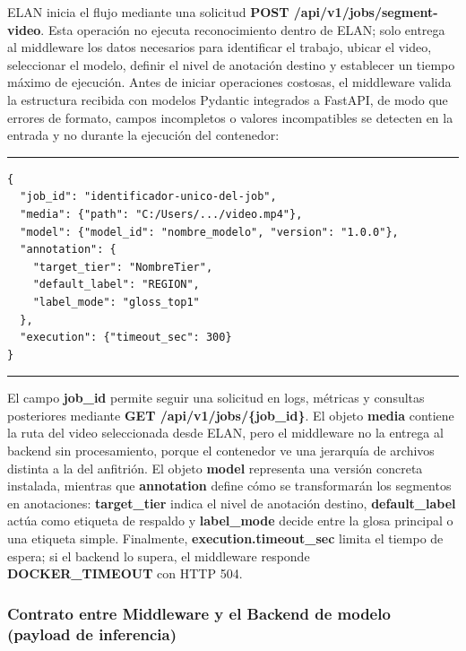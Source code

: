 \documentclass[11pt,a4paper]{article}
\begin{document}
ELAN inicia el flujo mediante una solicitud \textbf{POST /api/v1/jobs/segment-video}. Esta operación no ejecuta reconocimiento dentro de ELAN; solo entrega al middleware los datos necesarios para identificar el trabajo, ubicar el video, seleccionar el modelo, definir el nivel de anotación destino y establecer un tiempo máximo de ejecución. Antes de iniciar operaciones costosas, el middleware valida la estructura recibida con modelos Pydantic integrados a FastAPI, de modo que errores de formato, campos incompletos o valores incompatibles se detecten en la entrada y no durante la ejecución del contenedor:

\begin{center}
\begin{minipage}{0.82\textwidth}
\hrule
\vspace{0.12cm}
\small
\begin{Verbatim}[baselinestretch=0.82]
{
  "job_id": "identificador-unico-del-job",
  "media": {"path": "C:/Users/.../video.mp4"},
  "model": {"model_id": "nombre_modelo", "version": "1.0.0"},
  "annotation": {
    "target_tier": "NombreTier",
    "default_label": "REGION",
    "label_mode": "gloss_top1"
  },
  "execution": {"timeout_sec": 300}
}
\end{Verbatim}
\vspace{0.05cm}
\hrule

\label{lst:request_elan_middleware}
\end{minipage}
\end{center}

El campo \textbf{job\_id} permite seguir una solicitud en logs, métricas y consultas posteriores mediante \textbf{GET /api/v1/jobs/\{job\_id\}}. El objeto \textbf{media} contiene la ruta del video seleccionada desde ELAN, pero el middleware no la entrega al backend sin procesamiento, porque el contenedor ve una jerarquía de archivos distinta a la del anfitrión. El objeto \textbf{model} representa una versión concreta instalada, mientras que \textbf{annotation} define cómo se transformarán los segmentos en anotaciones: \textbf{target\_tier} indica el nivel de anotación destino, \textbf{default\_label} actúa como etiqueta de respaldo y \textbf{label\_mode} decide entre la glosa principal o una etiqueta simple. Finalmente, \textbf{execution.timeout\_sec} limita el tiempo de espera; si el backend lo supera, el middleware responde \textbf{DOCKER\_TIMEOUT} con HTTP 504.

\subsubsection{Contrato entre Middleware y el Backend de modelo (payload de inferencia)}
\end{document}
